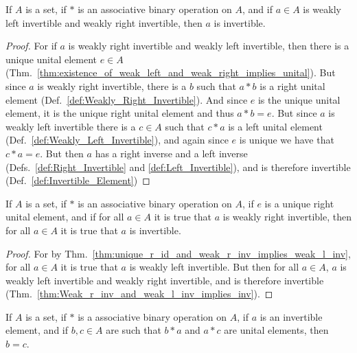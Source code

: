     \begin{theorem}
        \label{thm:Weak_r_inv_and_weak_l_inv_implies_inv}%
        If $A$ is a set, if $*$ is an associative binary operation on $A$, and
        if $a\in{A}$ is weakly left invertible and weakly right invertible, then
        $a$ is invertible.
    \end{theorem}
    \begin{proof}
        For if $a$ is weakly right invertible and weakly left invertible, then
        there is a unique unital element $e\in{A}$
        (Thm.~\ref{thm:existence_of_weak_left_and_weak_right_implies_unital}).
        But since $a$ is weakly right invertible, there is a $b$ such that
        $a*b$ is a right unital element
        (Def.~\ref{def:Weakly_Right_Invertible}). And since $e$ is the unique
        unital element, it is the unique right unital element and thus $a*b=e$.
        But since $a$ is weakly left invertible there is a $c\in{A}$ such that
        $c*a$ is a left unital element (Def.~\ref{def:Weakly_Left_Invertible}),
        and again since $e$ is unique we have that $c*a=e$. But then $a$ has a
        right inverse and a left inverse
        (Defs.~\ref{def:Right_Invertible} and \ref{def:Left_Invertible}), and is
        therefore invertible (Def.~\ref{def:Invertible_Element})
    \end{proof}
    \begin{theorem}
        If $A$ is a set, if $*$ is an associative binary operation on $A$, if
        $e$ is a unique right unital element, and if for all $a\in{A}$ it is
        true that $a$ is weakly right invertible, then for all $a\in{A}$ it is
        true that $a$ is invertible.
    \end{theorem}
    \begin{proof}
        For by Thm.~\ref{thm:unique_r_id_and_weak_r_inv_implies_weak_l_inv},
        for all $a\in{A}$ it is true that $a$ is weakly left invertible.
        But then for all $a\in{A}$, $a$ is weakly left invertible and weakly
        right invertible, and is therefore invertible
        (Thm.~\ref{thm:Weak_r_inv_and_weak_l_inv_implies_inv}).
    \end{proof}
    \begin{theorem}
        \label{thm:Assoc_Op_Inverses_are_Unique}%
        If $A$ is a set, if $*$ is a associative binary operation on $A$, if $a$
        is an invertible element, and if $b,c\in{A}$ are such that $b*a$ and
        $a*c$ are unital elements, then $b=c$.
    \end{theorem}
